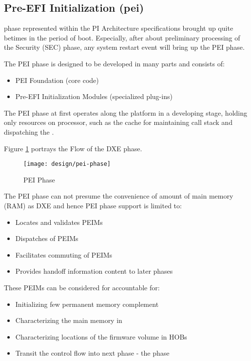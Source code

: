 \subsection{Pre-EFI Initialization (\gls{pei})}
 phase represented within the PI Architecture specifications brought up quite betimes in the period of boot. Especially, after about preliminary processing of the Security (SEC) phase, any system restart event will bring up the PEI phase.

The PEI phase is designed to be developed in many parts and consists of:
\begin{itemize}
	\item PEI Foundation (core code)
	\item Pre-EFI Initialization Modules (specialized plug-ins)
\end{itemize}

The PEI phase at first operates along the platform in a developing stage, holding only resources on processor, such as the cache for maintaining call stack and dispatching the .

Figure \ref{fig:pei-phase} portrays the Flow of the DXE phase.

\begin{figure}[!htbp]
	\centering
	\texttt{[image: design/pei-phase]}
	\caption{PEI Phase}\label{fig:pei-phase}
\end{figure}

The PEI phase can not presume the convenience of amount of main memory (RAM) as DXE and hence PEI phase support is limited to:
\begin{itemize}
	\item Locates and validates PEIMs
	\item Dispatches of PEIMs
	\item Facilitates commuting of PEIMs
	\item Provides handoff information content to later phases
\end{itemize}

These PEIMs can be considered for accountable for:
\begin{itemize}
	\item Initializing few permanent memory complement
	\item Characterizing the main memory in 
	\item Characterizing locations of the firmware volume in HOBs
	\item Transit the control flow into next phase - the  phase
\end{itemize}

